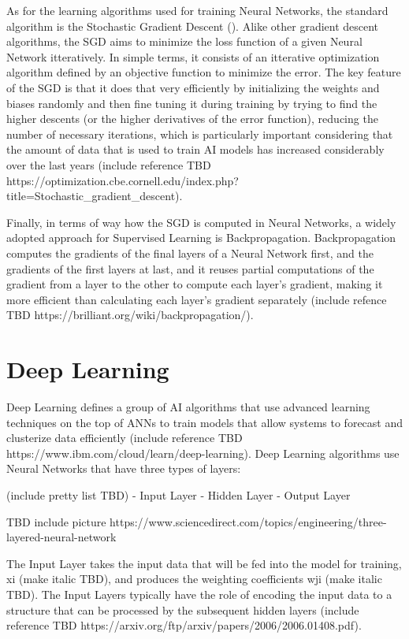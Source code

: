 \documentclass[openright]{normas-utf-tex} %
\begin{document}
As for the learning algorithms used for training Neural Networks, 
the standard algorithm is the Stochastic Gradient Descent ().
Alike other gradient descent algorithms, the SGD aims to minimize the loss function of a given
Neural Network itteratively. In simple terms, it consists of an itterative optimization algorithm defined by an
objective function to minimize the error.
The key feature of the SGD is that it does that very efficiently by initializing the weights
and biases randomly and then fine tuning it during training by trying to find the higher descents 
(or the higher derivatives of the error function), reducing the number of necessary iterations, 
which is particularly important considering that the amount of data that is used to train AI
models has increased considerably over the last years 
(include reference TBD https://optimization.cbe.cornell.edu/index.php?title=Stochastic_gradient_descent).

Finally, in terms of way how the SGD is computed in Neural Networks, a widely adopted approach 
for Supervised Learning is Backpropagation. Backpropagation computes the gradients of the final 
layers of a Neural Network first, and the gradients of the first layers at last, 
and it reuses partial computations of the gradient from a layer to the other to compute each layer's 
gradient, making it more efficient than calculating each layer's gradient separately
(include refence TBD https://brilliant.org/wiki/backpropagation/). 

\section{Deep Learning}

Deep Learning defines a group of AI algorithms that use advanced learning techniques on the 
top of ANNs to train models that allow systems to forecast and clusterize data 
efficiently (include reference TBD https://www.ibm.com/cloud/learn/deep-learning).
Deep Learning algorithms use Neural Networks that have three types of layers:

(include pretty list TBD)
- Input Layer
- Hidden Layer
- Output Layer

TBD include picture https://www.sciencedirect.com/topics/engineering/three-layered-neural-network

The Input Layer takes the input data that will be fed into the model for training,
xi (make italic TBD), and produces the weighting coefficients wji (make italic TBD). The Input Layers
typically have the role of encoding the input data to a structure that can be processed by the 
subsequent hidden layers (include reference TBD https://arxiv.org/ftp/arxiv/papers/2006/2006.01408.pdf).
\end{document}
